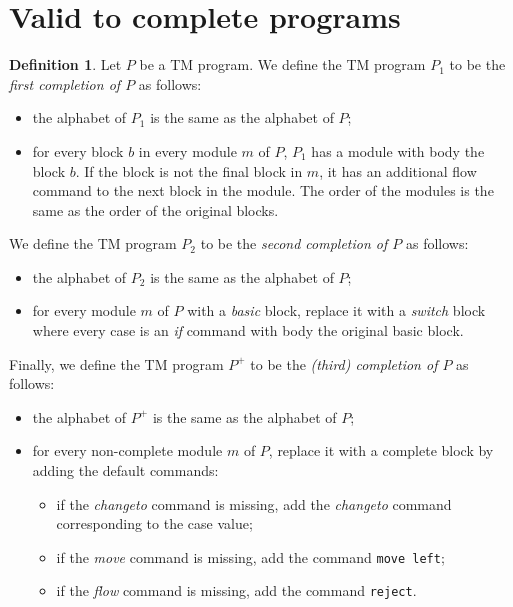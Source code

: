 \documentclass{article}
\theoremstyle{definition}
\newtheorem{definition}[theorem]{Definition}
\begin{document}
    \section{Valid to complete programs}
    \begin{definition}
        Let $P$ be a TM program. We define the TM program $P_1$ to be the \emph{first completion of $P$} as follows:
        \begin{itemize}
            \item the alphabet of $P_1$ is the same as the alphabet of $P$;
            \item for every block $b$ in every module $m$ of $P$, $P_1$ has a module with body the block $b$. If the block is not the final block in $m$, it has an additional flow command to the next block in the module. The order of the modules is the same as the order of the original blocks.
        \end{itemize}
        We define the TM program $P_2$ to be the \emph{second completion of $P$} as follows:
        \begin{itemize}
            \item the alphabet of $P_2$ is the same as the alphabet of $P$;
            \item for every module $m$ of $P$ with a \textit{basic} block, replace it with a \textit{switch} block where every case is an \textit{if} command with body the original basic block.
        \end{itemize}
        Finally, we define the TM program $P^+$ to be the \emph{(third) completion of $P$} as follows:
        \begin{itemize}
            \item the alphabet of $P^+$ is the same as the alphabet of $P$;
            \item for every non-complete module $m$ of $P$, replace it with a complete block by adding the default commands:
            \begin{itemize}
                \item if the \textit{changeto} command is missing, add the \textit{changeto} command corresponding to the case value;
                \item if the \textit{move} command is missing, add the command \texttt{move left};
                \item if the \textit{flow} command is missing, add the command \texttt{reject}.
            \end{itemize}
        \end{itemize}
    \end{definition}
\end{document}
